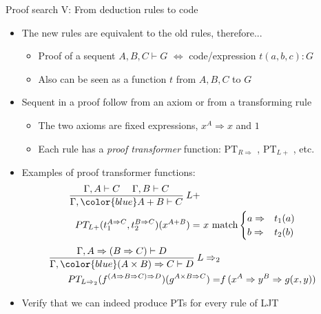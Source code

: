 \documentclass[english]{beamer}
\begin{document}
\begin{frame}{Proof search V: From deduction rules to code}

\begin{itemize}
\item The new rules are equivalent to the old rules, therefore...
\begin{itemize}
\item Proof of a sequent $A,B,C\vdash G$ $\Leftrightarrow$ code/expression
$t(a,b,c):G$
\item Also can be seen as a function $t$ from $A,B,C$ to $G$
\end{itemize}
\item Sequent in a proof follow from an axiom or from a transforming rule
\begin{itemize}
\item The two axioms are fixed expressions, $x^{A}\Rightarrow x$ and $1$
\item Each rule has a \emph{proof transformer} function: $\text{PT}_{R\Rightarrow}$
, $\text{PT}_{L+}$ , etc.
\end{itemize}
\item Examples of proof transformer functions:
\begin{align*}
\frac{\Gamma,A\vdash C\quad\;\Gamma,B\vdash C}{\Gamma,{\color{blue}A+B}\vdash C}\:L+\\
PT_{L+}(t_{1}^{A\Rightarrow C},t_{2}^{B\Rightarrow C})(x^{A+B})= & \ x\ \text{match}\begin{cases}
a\Rightarrow & t_{1}(a)\\
b\Rightarrow & t_{2}(b)
\end{cases}
\end{align*}
\begin{align*}
\frac{\Gamma,A\Rightarrow(B\Rightarrow C)\vdash D}{\Gamma,{\color{blue}(A\times B)\Rightarrow C}\vdash D}\:L\Rightarrow_{2}\\
PT_{L\Rightarrow_{2}}(f^{\left(A\Rightarrow B\Rightarrow C\right)\Rightarrow D})(g^{A\times B\Rightarrow C})= & f\,(x^{A}\Rightarrow y^{B}\Rightarrow g(x,y))
\end{align*}
\item Verify that we can indeed produce PTs for every rule of LJT
\end{itemize}
\end{frame}
\end{document}
